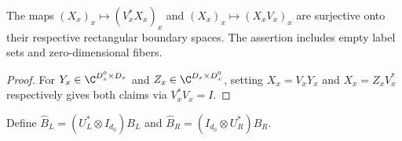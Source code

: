 \begin{lemma}
    \label{thm:mpo_joint_boundary_extraction}
    \leanok
    The maps $(X_x)_x\mapsto(V_x^*X_x)_x$ and
    $(X_x)_x\mapsto(X_xV_x)_x$ are surjective onto their respective
    rectangular boundary spaces. The assertion includes empty label
    sets and zero-dimensional fibers.
\end{lemma}
\begin{proof}
    \leanok
    For $Y_x\in\C^{D_x^0\times D_x}$ and $Z_x\in\C^{D_x\times D_x^0}$,
    setting $X_x=V_xY_x$ and $X_x=Z_xV_x^*$ respectively gives both
    claims via $V_x^*V_x=I$.
\end{proof}

\begin{definition}
    \label{def:mpo_joint_polar_edge_compression}
    \leanok
    Define $\widehat B_L=(U_L^*\otimes I_{d_0})B_L$ and
    $\widehat B_R=(I_{d_0}\otimes U_R^*)B_R$.
\end{definition}

